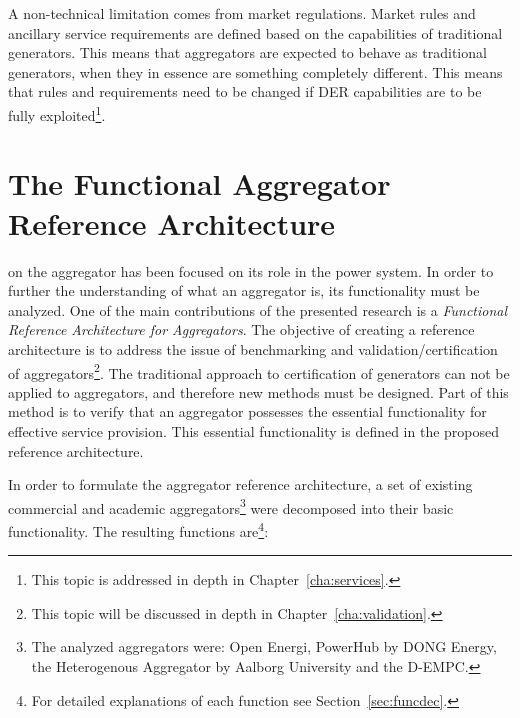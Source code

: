 A non-technical limitation comes from market regulations. Market rules and ancillary service requirements are defined based on the capabilities of traditional generators. This means that aggregators are expected to behave as traditional generators, when they in essence are something completely different. This means that rules and requirements need to be changed if DER capabilities are to be fully exploited\footnote{This topic is addressed in depth in Chapter~\ref{cha:services}.}.

\section{The Functional Aggregator Reference Architecture}\label{sec:MAINaggrefarch}
 on the aggregator has been focused on its role in the power system. In order to further the understanding of what an aggregator is, its functionality must be analyzed. One of the main contributions of the presented research is a \emph{Functional Reference Architecture for Aggregators}. The objective of creating a reference architecture is to address the issue of benchmarking and validation/certification of aggregators\footnote{This topic will be discussed in depth in Chapter~\ref{cha:validation}.}. The traditional approach to certification of generators can not be applied to aggregators, and therefore new methods must be designed. Part of this method is to verify that an aggregator possesses the essential functionality for effective service provision. This essential functionality is defined in the proposed reference architecture.

In order to formulate the aggregator reference architecture, a set of existing commercial and academic aggregators\footnote[][-2em]{The analyzed aggregators were: Open Energi\cite{openenergi}, PowerHub by DONG Energy\cite{powerhub}, the Heterogenous Aggregator by Aalborg University\cite{rahnama2014evaluation} and the D-EMPC\cite{costanzo2013coordination}.}  were decomposed into their basic functionality. The resulting functions are\footnote{For detailed explanations of each function see Section~\ref{sec:funcdec}.}:


